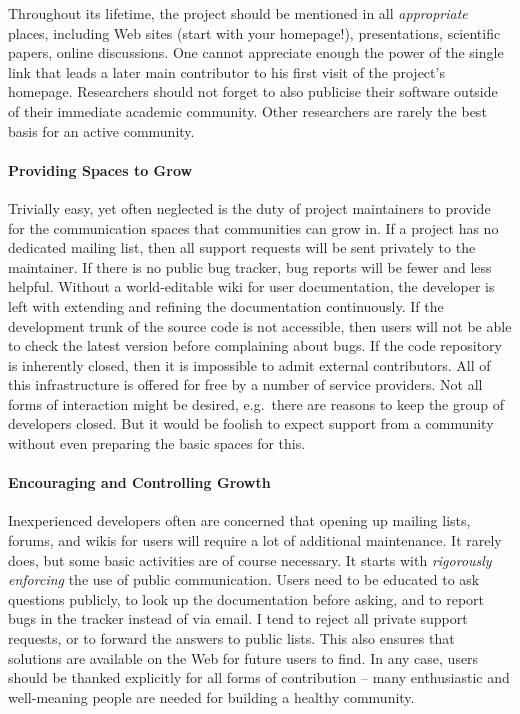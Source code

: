 Throughout its lifetime, the project should be mentioned in all \emph{appropriate} places, including Web sites (start with your homepage!), presentations, scientific papers, online discussions. One cannot appreciate enough the power of the single link that leads a later main contributor to his first visit of the project's homepage. Researchers should not forget to also publicise their software outside of their immediate academic community. Other researchers are rarely the best basis for an active community.

\paragraph*{Providing Spaces to Grow}
Trivially easy, yet often neglected is the duty of project maintainers to provide for the communication spaces that communities can grow in. If a project has no dedicated mailing list, then all support requests will be sent privately to the maintainer. If there is no public bug tracker, bug reports will be fewer and less helpful. Without a world-editable wiki for user documentation, the developer is left with extending and refining the documentation continuously. If the development trunk of the source code is not accessible, then users will not be able to check the latest version before complaining about bugs. If the code repository is inherently closed, then it is impossible to admit external contributors. All of this infrastructure is offered for free by a number of service providers. Not all forms of interaction might be desired, e.g.\ there are reasons to keep the group of developers closed. But it would be foolish to expect support from a community without even preparing the basic spaces for this.

\paragraph*{Encouraging and Controlling Growth}
Inexperienced developers often are concerned that opening up mailing lists, forums, and wikis for users will require a lot of additional maintenance. It rarely does, but some basic activities are of course necessary. It starts with \emph{rigorously enforcing} the use of public communication. Users need to be educated to ask questions publicly, to look up the documentation before asking, and to report bugs in the tracker instead of via email. I tend to reject all private support requests, or to forward the answers to public lists. This also ensures that solutions are available on the Web for future users to find. In any case, users should be thanked explicitly for all forms of contribution -- many enthusiastic and well-meaning people are needed for building a healthy community.

